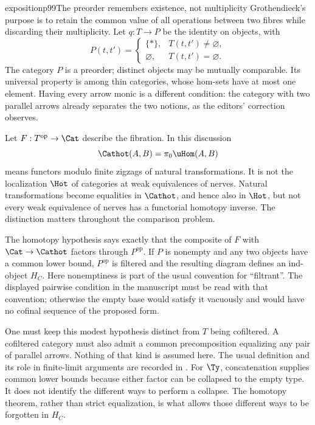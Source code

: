 \begin{dcomment}{exposition}{p99}{The preorder remembers existence, not multiplicity}
Grothendieck's purpose is to retain the common value of all operations between two fibres while discarding their multiplicity. Let $q:T\to P$ be the identity on objects, with
\[
 P(t,t')=\begin{cases}\{*\},&T(t,t')\ne\varnothing,\\
 \varnothing,&T(t,t')=\varnothing.\end{cases}
\]
The category $P$ is a preorder; distinct objects may be mutually comparable. Its universal property is among thin categories, whose hom-sets have at most one element. Having every arrow monic is a different condition: the category with two parallel arrows already separates the two notions, as the editors' correction observes.

Let $F:T^{\mathrm{op}}\to\Cat$ describe the fibration. In this discussion
\[
 \Cathot(A,B)=\pi_0\uHom(A,B)
\]
means functors modulo finite zigzags of natural transformations. It is not the localization $\Hot$ of categories at weak equivalences of nerves. Natural transformations become equalities in $\Cathot$, and hence also in $\Hot$, but not every weak equivalence of nerves has a functorial homotopy inverse. The distinction matters throughout the comparison problem.

The homotopy hypothesis says exactly that the composite of $F$ with $\Cat\to\Cathot$ factors through $P^{\mathrm{op}}$. If $P$ is nonempty and any two objects have a common lower bound, $P^{\mathrm{op}}$ is filtered and the resulting diagram defines an ind-object $H_C$. Here nonemptiness is part of the usual convention for ``filtrant''. The displayed pairwise condition in the manuscript must be read with that convention; otherwise the empty base would satisfy it vacuously and would have no cofinal sequence of the proposed form.

One must keep this modest hypothesis distinct from $T$ being cofiltered. A cofiltered category must also admit a common precomposition equalizing any pair of parallel arrows. Nothing of that kind is assumed here. The usual definition and its role in finite-limit arguments are recorded in \citet[Categories, Definition~4.19.1 and Lemma~4.19.2]{StacksProject}. For $\Ty$, concatenation supplies common lower bounds because either factor can be collapsed to the empty type. It does not identify the different ways to perform a collapse. The homotopy theorem, rather than strict equalization, is what allows those different ways to be forgotten in $H_C$.
\end{dcomment}

